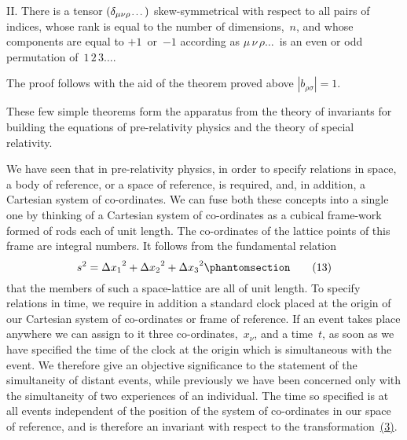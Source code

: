 \documentclass[12pt]{book}[2005/09/16]
\newcommand{\Change}[2]{#2}
\newcommand{\Add}[1]{\Change{}{#1}}
\newcommand{\PageSep}[1]{\ignorespaces}
\newcommand{\Tag}[1]{%
  \phantomsection
  \label{eqn:#1}
  \tag*{#1}
}
\newcommand{\Eqref}[1]{\hyperref[eqn:#1]{#1}}
\newcommand{\Subdots}{\,\mbox{\footnotesize$\cdots$}}
\begin{document}
II\@. There is a tensor $(\delta_{\mu\nu\rho\Subdots})$ skew-symmetrical with
respect to all pairs of indices, whose rank is equal to the
number of dimensions,~$n$, and whose components are
equal to $+1$~or~$-1$ according as $\mu\,\nu\,\rho\dots$~is an even
or odd permutation of~$1\,2\,3\dots$\Add{.}

The proof follows with the aid of the theorem proved
above $|b_{\rho\sigma}| = 1$.

These few simple theorems form the apparatus from
the theory of invariants for building the equations of pre-relativity
physics and the theory of special relativity.

We have seen that in pre-relativity physics, in order to
specify relations in space, a body of reference, or a space
of reference, is required, and, in addition, a Cartesian
system of co-ordinates. We can fuse both these concepts
into a single one by thinking of a Cartesian system of
co-ordinates as a cubical frame-work formed of rods each
of unit length. The co-ordinates of the lattice points of
\PageSep{17}
this frame are integral numbers. It follows from the
fundamental relation
\[
s^{2} = {\Delta x_{1}}^{2} + {\Delta x_{2}}^{2} + {\Delta x_{3}}^{2}
\Change{}{\Tag{(13)}}
\]
that the members of such a space-lattice are all of unit
length. To specify relations in time, we require in
addition a standard clock placed at the origin of our
Cartesian system of co-ordinates or frame of reference.
If an event takes place anywhere we can assign to it three
co-ordinates,~$x_{\nu}$, and a time~$t$, as soon as we have specified
the time of the clock at the origin which is simultaneous
with the event. We therefore give an objective significance
to the statement of the simultaneity of distant
%
events, while previously we have been concerned only
with the simultaneity of two experiences of an individual.
The time so specified is at all events independent of the
position of the system of co-ordinates in our space of
reference, and is therefore an invariant with respect to
the transformation~\Eqref{(3)}.
\end{document}
